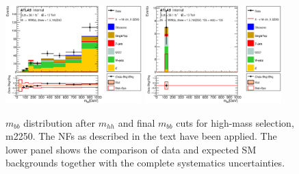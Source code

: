 \begin{figure}
\begin{center}
\includegraphics*[width=0.47\textwidth] {figures/Unblinded_mbb/C_reOpt2000_bbpt350_wwpt250_drww15_hh2250_bbMass_regionA_met25d020.eps}
\includegraphics*[width=0.47\textwidth] {figures/Unblinded_mbb/C_reOpt2000_bbpt350_wwpt250_drww15_hh2250_mbb_bbMass_regionA_met25d020.eps}
\caption[$m_{bb}$ distribution after $m_{hh}$ and final $m_{bb}$ cuts for high-mass selection, m2250.]{$m_{bb}$ distribution after $m_{hh}$ and final $m_{bb}$ cuts for high-mass selection, m2250. The NFs as described in the text have been applied. The lower panel shows the comparison of data and expected SM backgrounds together with the complete systematics uncertainties.}
\end{center}
\end{figure}


